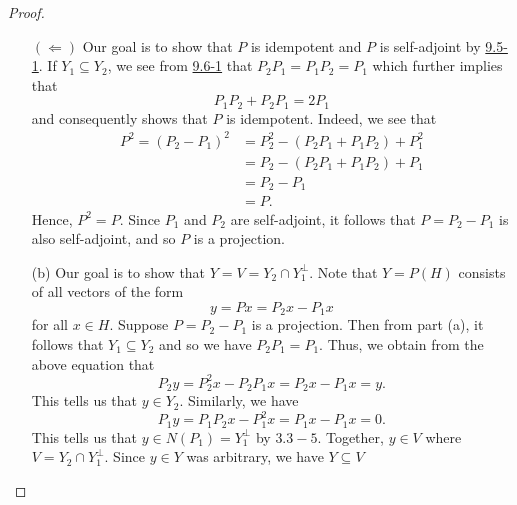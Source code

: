\begin{proof}
\begin{enumerate}
        \( (\Longleftarrow) \) Our goal is to show that \( P  \) is idempotent and \( P  \) is self-adjoint by {\hyperref[9.5-1]{9.5-1}}. If \( {Y}_{1} \subseteq {Y}_{2} \), we see from {\hyperref[9.6-1]{9.6-1}} that \( {P}_{2}{P}_{1} = {P}_{1} {P}_{2} = {P}_{1} \) which further implies that 
        \[  {P}_{1}{P}_{2} + {P}_{2} {P}_{1} = 2 {P}_{1} \]
        and consequently shows that \( P \) is idempotent. Indeed, we see that  
        \begin{align*}
            P^{2} = ({P}_{2} - {P}_{1})^{2} 
                  &= {P}_{2}^{2} - ({P}_{2} {P}_{1} + {P}_{1} {P}_{2}) + {P}_{1}^{2} \\
                  &= {P}_{2} - ({P}_{2} {P}_{1} + {P}_{1} {P}_{2}) + {P}_{1} \\
                  &= {P}_{2} - {P}_{1} \\
                  &= P.
        \end{align*}
        Hence, \( P^{2} = P  \).
        Since \( {P}_{1} \) and \( {P}_{2} \) are self-adjoint, it follows that \( P = {P}_{2} - {P}_{1} \) is also self-adjoint, and so \( P  \) is a projection.
    \item[(b)] Our goal is to show that \( Y  = V =  {Y}_{2} \cap {Y}_{1}^{\perp}  \). Note that \( Y = P(H) \) consists of all vectors of the form 
        \[  y = Px = {P}_{2}x - {P}_{1}x \]
        for all \( x \in H \). Suppose \( P = {P}_{2} - {P}_{1} \) is a projection. Then from part (a), it follows that \( {Y}_{1} \subseteq {Y}_{2} \) and so we have \( {P}_{2} {P}_{1} = {P}_{1} \). Thus, we obtain from the above equation that 
        \[  {P}_{2} y = {P}_{2}^{2} x - {P}_{2} {P}_{1} x = {P}_{2} x - {P}_{1} x = y.  \]
        This tells us that \( y \in {Y}_{2} \). Similarly, we have   
        \[  {P}_{1}y = {P}_{1}{P}_{2}x - {P}_{1}^{2}x = {P}_{1}x - {P}_{1}x = 0.  \]
        This tells us that \( y \in N({P}_{1}) = {Y}_{1}^{\perp} \) by \( {\hyperref[3.3-5]{3.3-5}}  \). Together, \( y \in V  \) where \( V = {Y}_{2} \cap {Y}_{1}^{\perp} \). Since \( y \in Y  \) was arbitrary, we have \( Y \subseteq V  \) 


\end{enumerate}
\end{proof}
